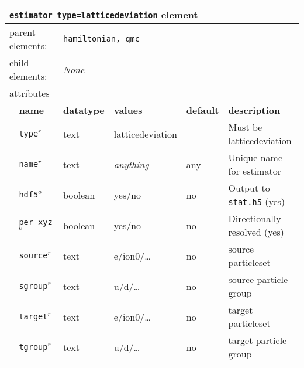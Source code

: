 \FloatBarrier
\begin{table}[h]
\begin{center}
\begin{tabularx}{\textwidth}{l l l l l X }
\hline
\multicolumn{6}{l}{\texttt{estimator type=latticedeviation} element} \\
\hline
\multicolumn{2}{l}{parent elements:} & \multicolumn{4}{l}{\texttt{hamiltonian, qmc}}\\
\multicolumn{2}{l}{child  elements:} & \multicolumn{4}{l}{\textit{None}}\\
\multicolumn{2}{l}{attributes}  & \multicolumn{4}{l}{}\\
   & \bfseries name       & \bfseries datatype & \bfseries values  & \bfseries default   & \bfseries description \\
   & \texttt{type}$^r$    &  text              & latticedeviation      &                     & Must be latticedeviation       \\
   & \texttt{name}$^r$    &  text              & \textit{anything} & any                 & Unique name for estimator \\
   & \texttt{hdf5}$^o$    &  boolean           & yes/no            & no                  & Output to \texttt{stat.h5} (yes) \\
   & \texttt{per\_xyz}$^o$    &  boolean           & yes/no            & no                  & Directionally resolved (yes) \\
   & \texttt{source}$^r$    &  text           & e/ion0/\dots         & no                  & source particleset \\
   & \texttt{sgroup}$^r$    &  text           & u/d/\dots         & no                  & source particle group \\
   & \texttt{target}$^r$    &  text           & e/ion0/\dots         & no                  & target particleset \\
   & \texttt{tgroup}$^r$    &  text           & u/d/\dots         & no                  & target particle group \\
  \hline
\end{tabularx}
\end{center}
\end{table}
\FloatBarrier

